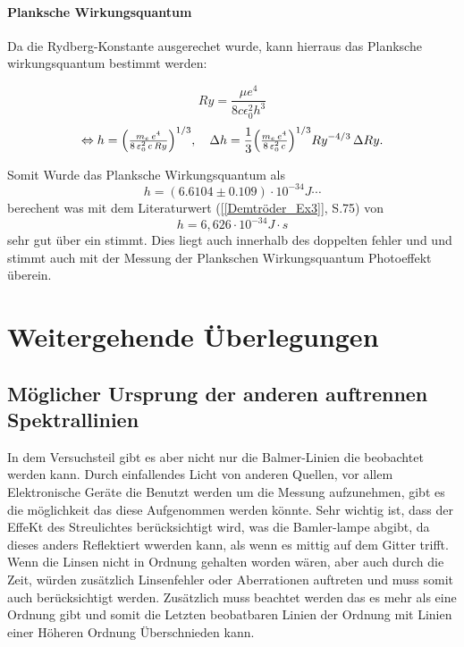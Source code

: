 \paragraph{Planksche Wirkungsquantum}

Da die Rydberg-Konstante ausgerechet wurde, kann hierraus das Planksche wirkungsquantum bestimmt werden:

\begin{equation}
    Ry = \frac{\mu e^4}{8 c \epsilon_0^2h^3}
\end{equation}
\begin{equation}
  \Leftrightarrow h
  = \Bigl(\tfrac{m_e\,e^{4}}{8\,\varepsilon_{0}^{2}\,c\,Ry}\Bigr)^{1/3},
  \quad
  \Delta h
  = \frac{1}{3}
    \Bigl(\tfrac{m_e\,e^{4}}{8\,\varepsilon_{0}^{2}\,c}\Bigr)^{1/3}
    Ry^{-4/3}\,\Delta Ry.
\end{equation}

Somit Wurde das Planksche Wirkungsquantum als
\begin{equation}
    h = (6.6104 \pm 0.109)\cdot 10^{-34} J\cdots
\end{equation}
berechent was mit dem Literaturwert (\cref{[Demtröder_Ex3]}, S.75) von
\begin{equation}
    h = 6,626 \cdot10^{-34} J\cdot s
\end{equation}
sehr gut über ein stimmt.
Dies liegt auch innerhalb des doppelten fehler und und stimmt auch mit der Messung der Plankschen Wirkungsquantum Photoeffekt überein.


\section{Weitergehende Überlegungen}
\subsection{Möglicher Ursprung der anderen auftrennen Spektrallinien}
In dem Versuchsteil gibt es aber nicht nur die Balmer-Linien die beobachtet werden kann. 
Durch einfallendes Licht von anderen Quellen, vor allem Elektronische Geräte die Benutzt werden um die Messung aufzunehmen, gibt es die möglichkeit das diese Aufgenommen werden könnte.
Sehr wichtig ist, dass der EffeKt des Streulichtes berücksichtigt wird, was die Bamler-lampe abgibt, da dieses anders Reflektiert wwerden kann, als wenn es mittig auf dem Gitter trifft.
Wenn die Linsen nicht in Ordnung gehalten worden wären, aber auch durch die Zeit, würden zusätzlich Linsenfehler oder Aberrationen auftreten und muss somit auch berücksichtigt werden. 
Zusätzlich muss beachtet werden das es mehr als eine Ordnung gibt und somit die Letzten beobatbaren Linien der Ordnung mit Linien einer Höheren Ordnung Überschnieden kann.

